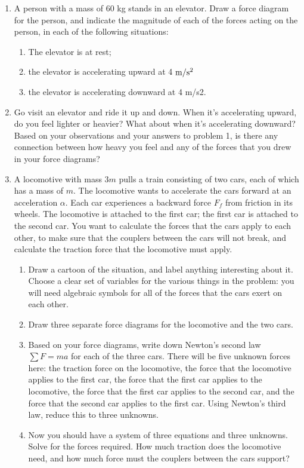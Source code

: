 \documentclass[12pt]{article}
\begin{document}
\Large
\centerline{}
\normalsize
\centerline{}

\begin{enumerate}

 	\item{A person with a mass of 60 kg stands in an elevator. Draw a force diagram for the
 	person, and indicate the magnitude of each of the forces acting on the person, in each
 	of the following situations:}
\begin{enumerate}
 	\item{The elevator is at rest;}
 	\item{the elevator is accelerating upward at 4 $\rm m/\rm s^2$} 
 	\item{the elevator is accelerating downward at 4 m/s2.}
\end{enumerate}

 	\item{Go visit an elevator and ride it up and down. When it’s accelerating upward, do you
 	feel lighter or heavier? What about when it’s accelerating downward? Based on your
 	observations and your answers to problem 1, is there any connection between how
 	heavy you feel and any of the forces that you drew in your force diagrams?}
 	

\item A locomotive with mass $3m$ pulls a train consisting of two cars, each of which has a mass of $m$. The locomotive wants to accelerate the cars forward at an acceleration $\alpha$. Each car experiences a backward force 
$F_f$ from friction in its wheels. The locomotive is attached to the first car; the first car is attached to the second car. You want to calculate the forces that the cars apply to each other, to make sure that the couplers 
between the cars will not break, and calculate the traction force that the locomotive must apply.

\begin{enumerate}
\item Draw a cartoon of the situation, and label anything interesting about it. Choose a clear set of variables for the various things in the problem: you will need algebraic symbols for all of the forces that the cars exert on each other.
\item Draw three separate force diagrams for the locomotive and the two cars.
\item Based on your force diagrams, write down Newton's second law $\sum F = ma$ for each of the three cars. There will be five unknown forces here: the traction force on the locomotive, the force that the locomotive applies to the first car,
the force that the first car applies to the locomotive, the force that the first car applies to the second car, and the force that the second car applies to the first car. Using Newton's third law, reduce this to three unknowns.
\item Now you should have a system of three equations and three unknowns. Solve for the forces required. How much 
traction does the locomotive need, and how much force must the couplers between the cars support?
\end{enumerate} 


\end{enumerate}
\end{document}
